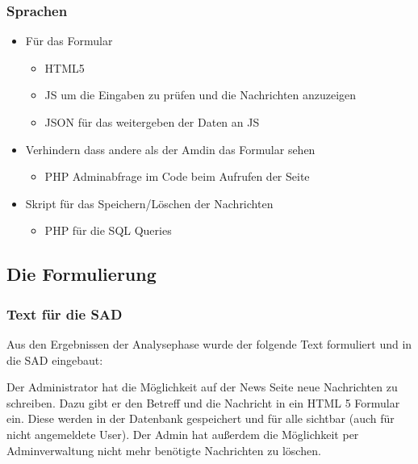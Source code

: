 \begin{frame} %
  \frametitle{Sprachen} %

   \begin{itemize}
    \item Für das Formular
    \begin{itemize}
     \item HTML5
     \item JS um die Eingaben zu prüfen und die Nachrichten anzuzeigen
     \item JSON für das weitergeben der Daten an JS
    \end{itemize}

    \item Verhindern dass andere als der Amdin das Formular sehen
    \begin{itemize}
     \item PHP Adminabfrage im Code beim Aufrufen der Seite
    \end{itemize}

    \item Skript für das Speichern/Löschen der Nachrichten
    \begin{itemize}
     \item PHP für die SQL Queries 
    \end{itemize}
    

   \end{itemize}

\end{frame}

\subsection{Die Formulierung}
\begin{frame} %
  \frametitle{Text für die SAD} %

  Aus den Ergebnissen der Analysephase wurde der folgende Text formuliert und in die SAD eingebaut:

  \begin{block}{}
	Der Administrator hat die Möglichkeit auf der News Seite neue Nachrichten zu schreiben. Dazu gibt er den
	Betreff und die Nachricht in ein HTML 5 Formular ein. Diese werden in der Datenbank gespeichert und für alle
	sichtbar (auch für nicht angemeldete User). Der Admin hat außerdem die Möglichkeit per Adminverwaltung
	nicht mehr benötigte Nachrichten zu löschen.
  \end{block}

\end{frame}

